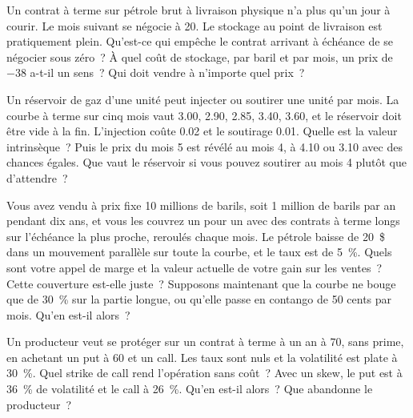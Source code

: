 \begin{question}\label{iq:iv2:commodities-and-energy:15}
Un contrat à terme sur pétrole brut à livraison physique n'a plus qu'un jour à courir. Le mois suivant se négocie à 20. Le stockage au point de livraison est pratiquement plein. Qu'est-ce qui empêche le contrat arrivant à échéance de se négocier sous zéro~? À quel coût de stockage, par baril et par mois, un prix de $-38$ a-t-il un sens~? Qui doit vendre à n'importe quel prix~?
\end{question}

\begin{question}\label{iq:iv2:commodities-and-energy:16}
Un réservoir de gaz d'une unité peut injecter ou soutirer une unité par mois. La courbe à terme sur cinq mois vaut 3.00, 2.90, 2.85, 3.40, 3.60, et le réservoir doit être vide à la fin. L'injection coûte 0.02 et le soutirage 0.01. Quelle est la valeur intrinsèque~? Puis le prix du mois 5 est révélé au mois 4, à 4.10 ou 3.10 avec des chances égales. Que vaut le réservoir si vous pouvez soutirer au mois 4 plutôt que d'attendre~?
\end{question}

\begin{question}\label{iq:iv2:commodities-and-energy:17}
Vous avez vendu à prix fixe 10 millions de barils, soit 1 million de barils par an pendant dix ans, et vous les couvrez un pour un avec des contrats à terme longs sur l'échéance la plus proche, reroulés chaque mois. Le pétrole baisse de 20~\$ dans un mouvement parallèle sur toute la courbe, et le taux est de 5~\%. Quels sont votre appel de marge et la valeur actuelle de votre gain sur les ventes~? Cette couverture est-elle juste~? Supposons maintenant que la courbe ne bouge que de 30~\% sur la partie longue, ou qu'elle passe en contango de 50 cents par mois. Qu'en est-il alors~?
\end{question}

\begin{question}\label{iq:iv2:commodities-and-energy:18}
Un producteur veut se protéger sur un contrat à terme à un an à 70, sans prime, en achetant un put à 60 et un call. Les taux sont nuls et la volatilité est plate à 30~\%. Quel strike de call rend l'opération sans coût~? Avec un skew, le put est à 36~\% de volatilité et le call à 26~\%. Qu'en est-il alors~? Que abandonne le producteur~?
\end{question}


